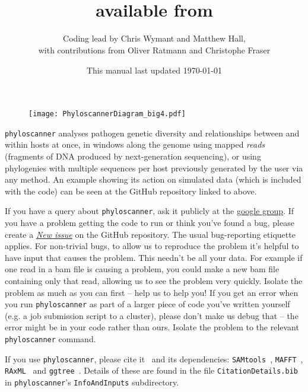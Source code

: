 \documentclass{article}
\title{\p\\available from \href{https://github.com/BDI-pathogens/phyloscanner}{\www{github.com/BDI-pathogens/phyloscanner}}}
\date{This manual last updated \today}
\author{Coding lead by Chris Wymant and Matthew Hall,\\with contributions from Oliver Ratmann and Christophe Fraser}
\newcommand{\p}{\texttt{phyloscanner}\xspace}
\let\c\texttt
\newcommand{\www}{\color{blue} \underline}
\begin{document}
\maketitle


\begin{figure}[!h]
\centering
\texttt{[image: PhyloscannerDiagram\_big4.pdf]}
\end{figure}

\vspace*{5mm}

\p analyses pathogen genetic diversity and relationships between and within hosts at once, in windows along the genome using mapped {\it reads} (fragments of DNA produced by next-generation sequencing), or using phylogenies with multiple sequences per host previously generated by the user via any method.
An example showing its action on simulated data (which is included with the code) can be seen at the GitHub repository linked to above.

\vspace*{5mm}

If you have a query about \p, ask it publicly at the \href{https://groups.google.com/forum/\#!forum/phyloscanner-users}{\www{google group}}.  
If you have a problem getting the code to run or think you've found a bug, please create a \href{https://github.com/BDI-pathogens/phyloscanner/issues}{\www{\it New issue}} on the GitHub repository.
The usual bug-reporting etiquette applies.
For non-trivial bugs, to allow us to reproduce the problem it's helpful to have input that causes the problem.
This needn't be all your data.
For example if one read in a bam file is causing a problem, you could make a new bam file containing only that read, allowing us to see the problem very quickly.
Isolate the problem as much as you can first -- help us to help you!
If you get an error when you run \p as part of a larger piece of code you've written yourself (e.g. a job submission script to a cluster), please don't make us debug that -- the error might be in your code rather than ours.
Isolate the problem to the relevant \p command.

\vspace*{5mm}

If you use \p, please cite it~\cite{Wymant157768} and its dependencies: \c{SAMtools}~\cite{Li08062009}, \c{MAFFT}~\cite{Katoh15072002}, \c{RAxML}~\cite{doi:10.1093/bioinformatics/btu033} and \c{ggtree}~\cite{MEE3:MEE312628}.
Details of these are found in the file \c{CitationDetails.bib} in \p's \c{InfoAndInputs} subdirectory.
\end{document}
